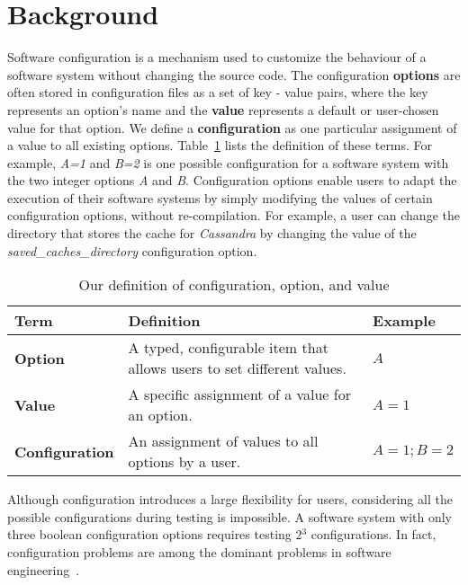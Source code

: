 
\section{Background}
\label{sec:back}



Software configuration is a mechanism used to customize the behaviour of a software system without changing the source code. The configuration \textbf{options} are often stored in configuration files as a set of key - value pairs, where the key represents an option's name and the \textbf{value} represents a default or user-chosen value for that option. We define a \textbf{configuration} as one particular assignment of a value to all existing options. Table~\ref{tab:terms} lists the definition of these terms. For example, \emph{A=1} and \emph{B=2} is one possible configuration for a software system with the two integer options \emph{A} and \emph{B}. Configuration options enable users to adapt the execution of their software systems by simply modifying the values of certain configuration options, without re-compilation. For example, a user can change the directory that stores the cache for \emph{Cassandra} by changing the value of the \textit{saved\_caches\_directory} configuration option.%

\begin{table}[t]
    \centering
    \caption{Our definition of configuration, option, and value}
    \begin{tabular}{l|p{6.6cm}|l}
        \hline
        Term & Definition & Example \\
        \hline
        \textbf{Option}  & A typed, configurable item that allows users to set different values. & $A$ \\
        \textbf{Value} & A specific assignment of a value for an option. & $A = 1$ \\
        \textbf{Configuration} & An assignment of values to all options by a user. & $A = 1; B = 2$ \\
        \hline
    \end{tabular}
    \label{tab:terms}
\end{table}


Although configuration introduces a large flexibility for users, considering all the possible configurations during testing is impossible. A software system with only three boolean configuration options requires testing 2${^3}$ configurations. In fact, configuration problems are among the dominant  problems in software engineering~\cite{tse,RN2897}.


